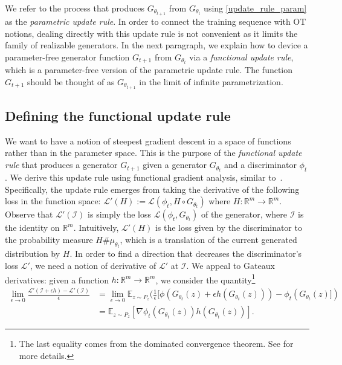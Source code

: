 \documentclass[runningheads]{llncs}
\newcommand\mycitet[1]{\cite{#1}}
\newcommand{\id}{\mathcal{I}}
\begin{document}
We refer to the process that produces $G_{\theta_{t+1}}$ from $G_{\theta_t}$ using \eqref{update_rule_param} as the \textit{parametric update rule}. In order to connect the training sequence with OT notions, dealing directly with this update rule is not convenient as it limits the family of realizable generators. In the next paragraph, we explain how to device a parameter-free generator function $G_{t+1}$ from $G_{\theta_{t}}$ via a \textit{functional update rule}, which is a parameter-free version of the parametric update rule. The function $G_{t+1}$ should be thought of as $G_{\theta_{t+1}}$ in the limit of infinite parametrization.

\subsection{Defining the functional update rule} We want to have a notion of steepest gradient descent in a space of functions rather than in the parameter space. This is the purpose of the \textit{functional update rule} that produces a generator $G_{t+1}$ given a generator $G_{\theta_t}$ and a discriminator $\phi_t$. We derive this update rule using functional gradient analysis, similar to~\mycitet{yamaguchi2018distributional,johnson2018composite}. Specifically, the update rule emerges from taking the derivative of the following loss in the function space: 
$\mathcal{L}'(H):=\mathcal{L}(\phi_t,H\circ G_{\theta_t})$ where $H:\mathds{R}^m \rightarrow \mathds{R}^m$. Observe that $\mathcal{L}'(\id)$ is simply the loss $\mathcal{L}(\phi_t,G_{\theta_t})$ of the generator, where $\id$ is the identity on $\mathds{R}^m$. Intuitively, $\mathcal{L}'(H)$ is the loss given by the discriminator to the probability measure $H\# \mu_{\theta_t}$, which is a translation of the current generated distribution by $H$. In order to find a direction that decreases the discriminator's loss $\mathcal{L}'$, we need a notion of derivative of $\mathcal{L}'$ at $\id$. We appeal to Gateaux derivatives: given a function $h:\mathds{R}^m \rightarrow \mathds{R}^m$, we consider the quantity\footnote{The last equality comes from the dominated convergence theorem. See \cite{yamaguchi2018distributional} for more details.}
\begin{align}
\label{eq:directional_derivative}
    \lim_{\epsilon \rightarrow 0}\frac{\mathcal{L}'(\id+ \epsilon h)-\mathcal{L}'(\id)}{\epsilon}&=\lim_{\epsilon \rightarrow 0}\mathds{E}_{z\sim P_z}(\frac{1}{\epsilon}[\phi(G_{\theta_t}(z)+\epsilon h(G_{\theta_t}(z)))-\phi_t(G_{\theta_t}(z)])\nonumber \\
&=\mathds{E}_{z\sim P_z}[\nabla \phi_t(G_{\theta_t}(z)) h(G_{\theta_t}(z))].
\end{align}
\end{document}
